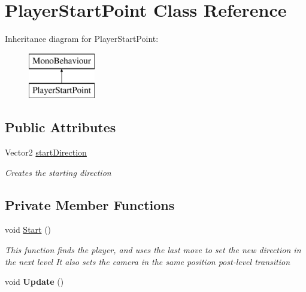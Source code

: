 \hypertarget{class_player_start_point}{}\section{Player\+Start\+Point Class Reference}
\label{class_player_start_point}
Inheritance diagram for Player\+Start\+Point\+:\begin{figure}[H]
\begin{center}
\leavevmode
\includegraphics[height=2.000000cm]{class_player_start_point}
\end{center}
\end{figure}
\subsection*{Public Attributes}
\begin{DoxyCompactItemize}
\item 
Vector2 \mbox{\hyperlink{class_player_start_point_abdc8a9f45e6064dad9a93c60e29a4832}{start\+Direction}}
\begin{DoxyCompactList}\small\item\em Creates the starting direction \end{DoxyCompactList}\end{DoxyCompactItemize}
\subsection*{Private Member Functions}
\begin{DoxyCompactItemize}
\item 
void \mbox{\hyperlink{class_player_start_point_a54401d0571e76bb7a7a3161a0147b787}{Start}} ()
\begin{DoxyCompactList}\small\item\em This function finds the player, and uses the last move to set the new direction in the next level It also sets the camera in the same position post-\/level transition \end{DoxyCompactList}\item 
\mbox{\label{class_player_start_point_adff99d06947271bc2275741911f659b1}} 
void {\bfseries Update} ()
\end{DoxyCompactItemize}
